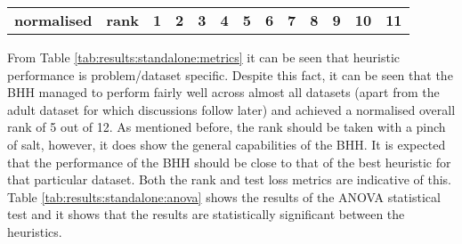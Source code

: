 \begin{table}[htbp]
{\begin{tabular}{rcccccccccccc}
			\textbf{normalised}                & \textbf{rank}                          & \cellcolor[rgb]{ .388,  .745,  .482}\textbf{1}                                     & \cellcolor[rgb]{ .51,  .78,  .486}\textbf{2}                              & \cellcolor[rgb]{ .631,  .816,  .494}\textbf{3}                            & \cellcolor[rgb]{ .753,  .851,  .502}\textbf{4}                            & \cellcolor[rgb]{ .875,  .886,  .51}\textbf{5} & \cellcolor[rgb]{ 1,  .922,  .518}\textbf{6} & \cellcolor[rgb]{ .996,  .824,  .502}\textbf{7} & \cellcolor[rgb]{ .992,  .722,  .482}\textbf{8} & \cellcolor[rgb]{ .984,  .616,  .459}\textbf{9} & \cellcolor[rgb]{ .98,  .514,  .439}\textbf{10} & \cellcolor[rgb]{ .973,  .412,  .42}\textbf{11} \\
		\end{tabular}%
	}
\end{table}%

From Table \ref{tab:results:standalone:metrics} it can be seen that heuristic performance is problem/dataset specific. Despite this fact, it can be seen that the \Ac{BHH} managed to perform fairly well across almost all datasets (apart from the adult dataset for which discussions follow later) and achieved a normalised overall rank of 5 out of 12. As mentioned before, the rank should be taken with a pinch of salt, however, it does show the general capabilities of the \Ac{BHH}. It is expected that the performance of the \Ac{BHH} should be close to that of the best heuristic for that particular dataset. Both the rank and test loss metrics are indicative of this. Table \ref{tab:results:standalone:anova} shows the results of the ANOVA statistical test and it shows that the results are statistically significant between the heuristics.


\begin{table}[htbp]
	\centering
	\caption{ANOVA - Rank - Standalone vs BHH Baseline}
	\label{tab:results:standalone:anova}%
	\par\bigskip
\end{table}

